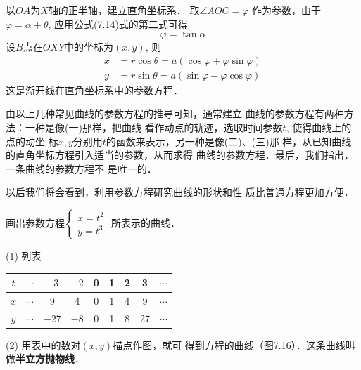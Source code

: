 以$OA$为$X$轴的正半轴，建立直角坐标系．
取$\angle AOC=\varphi$ 作为参数，由于
$\varphi =\alpha+\theta$, 
应用公式(7.14)式的第二式可得
$$\varphi  =\tan\alpha$$
设$B$点在$OXY$中的坐标为$(x,y)$, 则
\begin{equation}
\begin{split}
    x&=r\cos\theta=a(\cos\varphi+\varphi\sin\varphi)\\
    y&=r\sin\theta=a(\sin\varphi-\varphi\cos\varphi)
\end{split}
\end{equation}
这是渐开线在直角坐标系中的参数方程．

由以上几种常见曲线的参数方程的推导可知，通常建立
曲线的参数方程有两种方法：一种是像(一)那样，把曲线
看作动点的轨迹，选取时间参数$t$, 使得曲线上的点的动坐
标$x,y$分别用$t$的函数来表示，另一种是像(二)、(三)那
样，从已知曲线的直角坐标方程引入适当的参数，从而求得
曲线的参数方程．最后，我们指出，一条曲线的参数方程不
是唯一的．

以后我们将会看到，利用参数方程研究曲线的形状和性
质比普通方程更加方便．

\begin{example}
    画出参数方程$\begin{cases}
        x=t^2\\ y=t^3
    \end{cases}$
    所表示的曲线．
\end{example}


\begin{solution}
(1) 列表
\begin{center}
\begin{tabular}{ccccccccc}
\hline
$t$&$\cdots$ &$-3$ &$-2$&0&1&2&3&$\cdots$\\
\hline
$x$&$\cdots$ & 9&4&0&1&4&9             &$\cdots$ \\
$y$&$\cdots$ & $-27$&$-8$ &0&1&8&27  &$\cdots$ \\
\hline
\end{tabular}
\end{center}

(2) 用表中的数对$(x,y)$描点作图，就可
得到方程的曲线（图7.16）．这条曲线叫做\textbf{半立方抛物线}．

\begin{figure}[htp]
    \centering
{}
    \caption{}
\end{figure}

\end{solution}

